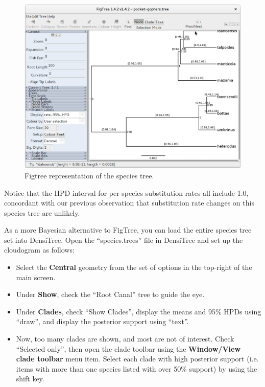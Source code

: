 \documentclass{article}
\begin{document}
\begin{figure}[htb!]
\centering
\includegraphics[width=\textwidth]{figures/figtree.png}
\caption{Figtree representation of the species tree.}
\label{fig:figtree}
\end{figure}

Notice that the HPD interval for per-species substitution rates all include
1.0, concordant with our previous observation that substitution rate changes on
this species tree are unlikely.

\clearpage

As a more Bayesian alternative to FigTree, you can load the entire species tree
set into DensiTree. Open the ``species.trees'' file in DensiTree and set up the
cloudogram as follows:

\begin{itemize}
\item Select the \textbf{Central} geometry from the set of options in the top-right of the main screen.
\item Under \textbf{Show}, check the ``Root Canal'' tree to guide the eye.
\item Under \textbf{Clades}, check ``Show Clades'', display the means and 95\% HPDs using ``draw'', and display the posterior support
using ``text''.
\item Now, too many clades are shown, and most are not of interest. Check
``Selected only'', then open the clade toolbar using the \textbf{Window/View
clade toolbar} menu item. Select each clade with high posterior support (i.e.
items with more than one species listed with over 50\% support) by using the
shift key.
\end{itemize}
\end{document}
